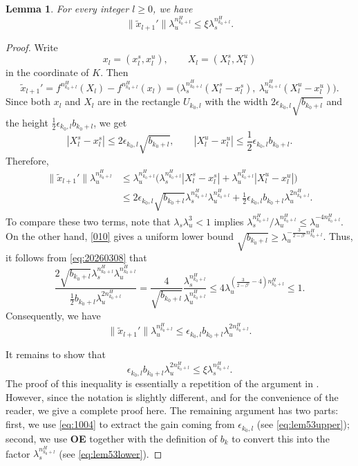 \documentclass{amsart}
\theoremstyle{plain}
\newtheorem{lem}[thm]{Lemma}
\theoremstyle{definition}
\theoremstyle{remark}
\numberwithin{equation}{section}
\begin{document}
\begin{lem}\label{lem:5.3}
For every integer $l\ge 0$, we have
\[
    \|\tilde x_{l+1}'\|\lambda_u^{n_{k_0+l}^H}\le\xi\lambda_s^{n_{k_0+l}^H}.
\]
\end{lem}
\begin{proof}
Write
\[
x_l=(x_l^s,x_l^u),\qquad X_l=(X_l^s,X_l^u)
\]
in the coordinate of $K$.
Then
\[
\tilde x_{l+1}'
=f^{n_{k_0+l}^H}(X_l) - f^{n_{k_0+l}^H}(x_l)
=\big(\lambda_{s}^{n_{k_0+l}^H}(X_l^s-x_l^s),\ \lambda_{u}^{n_{k_0+l}^H}(X_l^u-x_l^u)\big).
\]
Since both $x_l$ and $X_l$ are in the rectangle $U_{k_0,l}$ with the width $2\epsilon_{k_0,l}\sqrt{b_{k_0+l}}$ and the height $\frac12\epsilon_{k_0,l}b_{k_0+l}$, we get
\[
|X_l^s-x_l^s|\le 2\epsilon_{k_0,l}\sqrt{b_{k_0+l}},
\qquad
|X_l^u-x_l^u|\le \frac12\epsilon_{k_0,l}b_{k_0+l}.
\]
Therefore,
\begin{align*}
\|\tilde x_{l+1}'\|\lambda_{u}^{n_{k_0+l}^H}
&\le \lambda_{u}^{n_{k_0+l}^H}\Big(\lambda_{s}^{n_{k_0+l}^H}|X_l^s-x_l^s|+\lambda_{u}^{n_{k_0+l}^H}|X_l^u-x_l^u|\Big)\\
&\le 2\epsilon_{k_0,l}\sqrt{b_{k_0+l}}\lambda_{s}^{n_{k_0+l}^H}\lambda_{u}^{n_{k_0+l}^H}+\frac12\epsilon_{k_0,l}b_{k_0+l}\lambda_{u}^{2n_{k_0+l}^H}.
\end{align*}
To compare these two terms, note that $\lambda_s\lambda_u^3<1$ implies
$\lambda_{s}^{n_{k_0+l}^H}/\lambda_{u}^{n_{k_0+l}^H}
\le \lambda_u^{-4n_{k_0+l}^H}$.
On the other hand, \eqref{010} gives a uniform lower bound
$\sqrt{b_{k_0+l}}\ge \lambda_u^{-\frac{3}{2-\beta'}n_{k_0+l}^H}$. 
Thus, it follows from \eqref{eq:20260308} that
\[
\frac{2\sqrt{b_{k_0+l}}\lambda_{s}^{n_{k_0+l}^H}\lambda_{u}^{n_{k_0+l}^H}}{\frac12 b_{k_0+l}\lambda_{u}^{2n_{k_0+l}^H}}
= \frac{4}{\sqrt{b_{k_0+l}}}\frac{\lambda_{s}^{n_{k_0+l}^H}}{\lambda_{u}^{n_{k_0+l}^H}}
\le 4\lambda_u^{\left(\frac{3}{2-\beta'}-4\right)n_{k_0+l}^H}\le 1.
\]
Consequently, 
 we have
\[
\|\tilde x_{l+1}'\|\lambda_{u}^{n_{k_0+l}^H}\le \epsilon_{k_0,l}b_{k_0+l}\lambda_{u}^{2n_{k_0+l}^H}.
\]


It remains to show that
\begin{equation}\label{eq:lem53goal}
\epsilon_{k_0,l}b_{k_0+l}\lambda_{u}^{2n_{k_0+l}^H} \le \xi\lambda_{s}^{n_{k_0+l}^H}.
\end{equation}
The proof of this inequality is essentially a repetition of the argument in \cite{KLNS2022r}.
However, since the notation is slightly different, and for the convenience of the reader, we give a complete proof here.
The remaining argument has two parts: first, we use \eqref{eq:1004} to extract the gain coming from $\epsilon_{k_0,l}$ (see \eqref{eq:lem53upper}); second, we use {\bf OE} together with the definition of $b_k$ to convert this into the factor $\lambda_s^{n_{k_0+l}^H}$ (see \eqref{eq:lem53lower}).


\end{proof}
\end{document}
